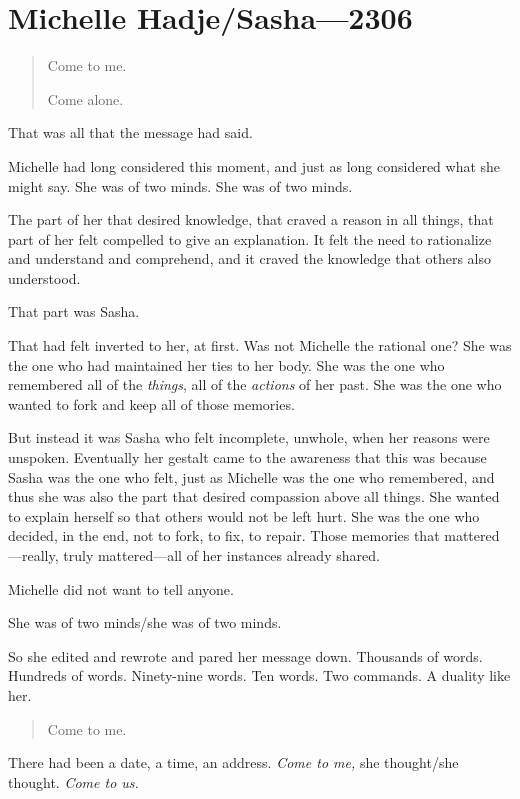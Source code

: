 \hypertarget{michelle-hadjesasha-2306}{%
\chapter{Michelle Hadje/Sasha---2306}\label{michelle-hadjesasha-2306}}

\begin{quote}
Come to me.

Come alone.
\end{quote}

That was all that the message had said.

Michelle had long considered this moment, and just as long considered what she might say. She was of two minds. She was of two minds.

The part of her that desired knowledge, that craved a reason in all things, that part of her felt compelled to give an explanation. It felt the need to rationalize and understand and comprehend, and it craved the knowledge that others also understood.

That part was Sasha.

That had felt inverted to her, at first. Was not Michelle the rational one? She was the one who had maintained her ties to her body. She was the one who remembered all of the \emph{things}, all of the \emph{actions} of her past. She was the one who wanted to fork and keep all of those memories.

But instead it was Sasha who felt incomplete, unwhole, when her reasons were unspoken. Eventually her gestalt came to the awareness that this was because Sasha was the one who felt, just as Michelle was the one who remembered, and thus she was also the part that desired compassion above all things. She wanted to explain herself so that others would not be left hurt. She was the one who decided, in the end, not to fork, to fix, to repair. Those memories that mattered---really, truly mattered---all of her instances already shared.

Michelle did not want to tell anyone.

She was of two minds/she was of two minds.

So she edited and rewrote and pared her message down. Thousands of words. Hundreds of words. Ninety-nine words. Ten words. Two commands. A duality like her.

\begin{quote}
Come to me.
\end{quote}

There had been a date, a time, an address. \emph{Come to me,} she thought/she thought. \emph{Come to us.}

